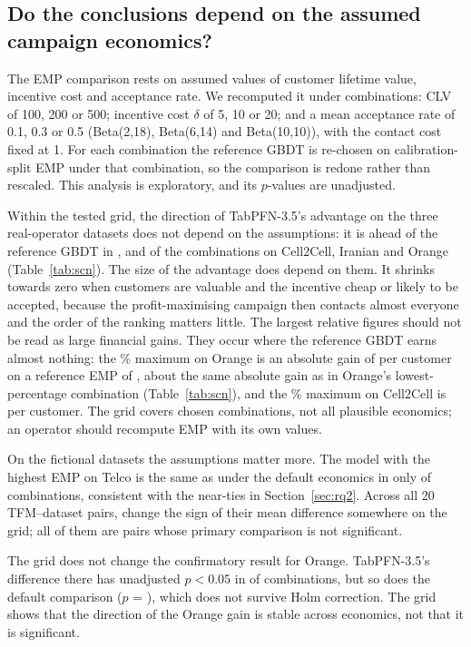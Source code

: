 \documentclass[11pt]{article}
\newcommand{\tfm}{TFM\xspace}
\begin{document}
\subsection{Do the conclusions depend on the assumed campaign economics?}\label{sec:scn}

The EMP comparison rests on assumed values of customer lifetime value, incentive cost and acceptance rate. We
recomputed it under \nScenarios{} combinations: CLV of 100, 200 or 500; incentive cost $\delta$ of 5, 10 or 20; and a
mean acceptance rate of 0.1, 0.3 or 0.5 (Beta(2,18), Beta(6,14) and Beta(10,10)), with the contact cost fixed at 1. For
each combination the reference GBDT is re-chosen on calibration-split EMP under that combination, so the comparison is
redone rather than rescaled. This analysis is exploratory, and its $p$-values are unadjusted.

Within the tested grid, the direction of TabPFN-3.5's advantage on the three real-operator datasets does not depend on
the assumptions: it is ahead of the reference GBDT in \scnPosCellTwoCell{}, \scnPosIranian{} and \scnPosOrange{} of the \nScenarios{}
combinations on Cell2Cell, Iranian and Orange (Table~\ref{tab:scn}). The size of the advantage does depend on them. It
shrinks towards zero when customers are valuable and the incentive cheap or likely to be accepted, because the
profit-maximising campaign then contacts almost everyone and the order of the ranking matters little. The largest
relative figures should not be read as large financial gains. They occur where the reference GBDT earns almost nothing:
the \scnRelMaxOrangeAbs\% maximum on Orange is an absolute gain of \scnAbsMaxOrange{} per customer on a reference EMP of
\scnRefMaxOrange, about the same absolute gain as in Orange's lowest-percentage combination (Table~\ref{tab:scn}), and the
\scnRelMaxCellTwoCellAbs\% maximum on Cell2Cell is \scnAbsMaxCellTwoCell{} per customer. The grid covers \nScenarios{}
chosen combinations, not all plausible economics; an operator should recompute EMP with its own values.

On the fictional datasets the assumptions matter more. The model with the highest EMP on Telco is the same as under the
default economics in only \scnTopSameTelco{} of \nScenarios{} combinations, consistent with the near-ties in
Section~\ref{sec:rq2}. Across all 20 \tfm--dataset pairs, \nScnSignFlip{} change the sign of their mean difference
somewhere on the grid; all of them are pairs whose primary comparison is not significant.

The grid does not change the confirmatory result for Orange. TabPFN-3.5's difference there has unadjusted $p<0.05$ in
\scnSigOrange{} of \nScenarios{} combinations, but so does the default comparison ($p$ = \nbpPFNThreeOrange), which does
not survive Holm correction. The grid shows that the direction of the Orange gain is stable across economics, not that
it is significant.
\end{document}
